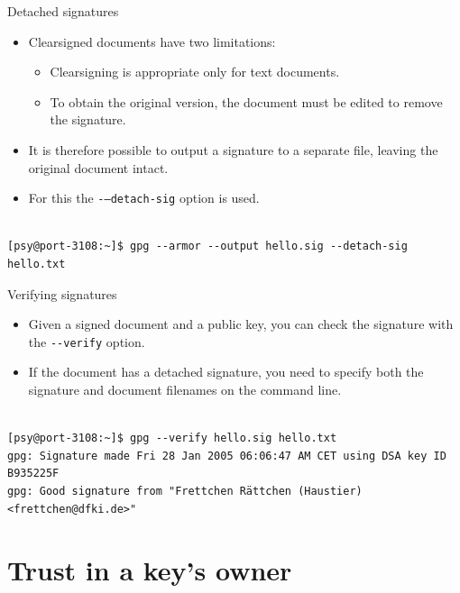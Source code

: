 \documentclass[%
mode=present,%
paper=screen%
]{powerdot}
\newcommand{\clopt}[1]{\texttt{{-}#1}}
\begin{document}
\begin{slide}[method=direct]{Detached signatures}
  \begin{itemize}
  \item Clearsigned documents have two limitations:
    \begin{itemize}
    \item Clearsigning is appropriate only for text documents.
    \item To obtain the original version, the document must be edited
      to remove the signature.
    \end{itemize}
  \item It is therefore possible to output a signature to a separate
    file, leaving the original document intact.
  \item For this the \clopt{--detach-sig} option is used.
  \end{itemize}
\begin{verbatim}

[psy@port-3108:~]$ gpg --armor --output hello.sig --detach-sig hello.txt
\end{verbatim}
\end{slide}

\begin{slide}[method=direct]{Verifying signatures}
  \begin{itemize}
  \item Given a signed document and a public key, you can check the
    signature with the \clopt{-verify} option.
  \item If the document has a detached signature, you need to specify
    both the signature and document filenames on the command line.
  \end{itemize}
\begin{verbatim}

[psy@port-3108:~]$ gpg --verify hello.sig hello.txt
gpg: Signature made Fri 28 Jan 2005 06:06:47 AM CET using DSA key ID B935225F
gpg: Good signature from "Frettchen Rättchen (Haustier) <frettchen@dfki.de>"
\end{verbatim}%
\end{slide}

\section{Trust in a key's owner}
\end{document}

